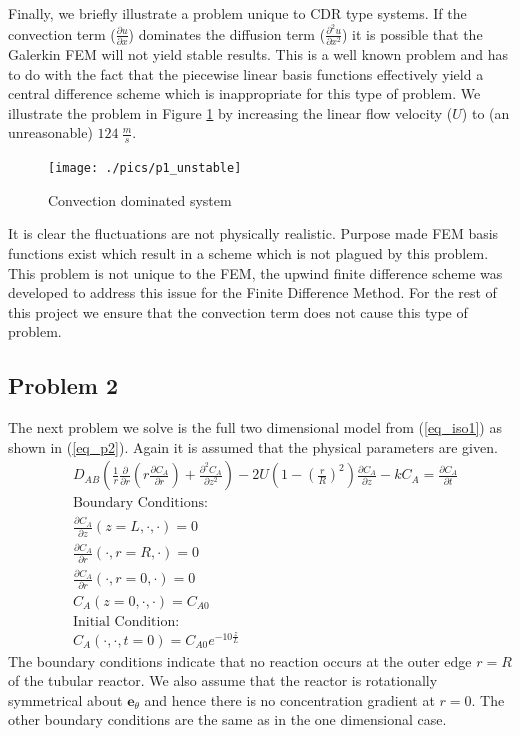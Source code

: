 \documentclass[11pt,fleqn]{article}
\theoremstyle{defstyle}
\begin{document}
Finally, we briefly illustrate a problem unique to CDR type systems. If the convection term ($\frac{\partial u}{\partial x}$) dominates the diffusion term ($\frac{\partial^2 u}{\partial x^2}$) it is possible that the Galerkin FEM will not yield stable results. This is a well known problem \cite{strang} and has to do with the fact that the piecewise linear basis functions effectively yield a central difference scheme which is inappropriate for this type of problem. We illustrate the problem in Figure \ref{fig_p1_unstab} by increasing the linear flow velocity ($U$) to (an unreasonable) $124~\frac{m}{s}$. 
\begin{figure}[H] 
\centering
\texttt{[image: ./pics/p1\_unstable]}
\caption{Convection dominated system} 
\label{fig_p1_unstab}
\end{figure}
It is clear the fluctuations are not physically realistic. Purpose made FEM basis functions exist which result in a scheme which is not plagued by this problem. This problem is not unique to the FEM, the upwind finite difference scheme was developed to address this issue for the Finite Difference Method. For the rest of this project we ensure that the convection term does not cause this type of problem.  

\subsection{Problem 2}
\label{section_iso2}
The next problem we solve is the full two dimensional model from (\ref{eq_iso1}) as shown in (\ref{eq_p2}). Again it is assumed that the physical parameters are given.
\begin{equation}
\begin{aligned}
&D_{AB}\left(\frac{1}{r}\frac{\partial}{\partial r}\left(r\frac{\partial C_A}{\partial r}\right) + \frac{\partial^2 C_A}{\partial z^2}\right) - 2U\left(1-\left(\frac{r}{R}\right)^2\right)\frac{\partial C_A}{\partial z} - kC_A = \frac{\partial C_A}{\partial t}\\
&\text{Boundary Conditions:} \\
&\frac{\partial C_A}{\partial z}(z=L, \cdot, \cdot) = 0\\
&\frac{\partial C_A}{\partial r}(\cdot, r = R, \cdot) = 0 \\
&\frac{\partial C_A}{\partial r}(\cdot, r = 0, \cdot) = 0 \\
&C_A(z=0,\cdot, \cdot) = C_{A0} \\
&\text{Initial Condition:} \\
& C_A(\cdot, \cdot, t= 0) = C_{A0}e^{-10\frac{z}{L}}
\end{aligned}
\label{eq_p2}
\end{equation}
The boundary conditions indicate that no reaction occurs at the outer edge $r=R$ of the tubular reactor. We also assume that the reactor is rotationally symmetrical about $\mathbf{e}_\theta$ and hence there is no concentration gradient at $r=0$. The other boundary conditions are the same as in the one dimensional case. 
\end{document}
